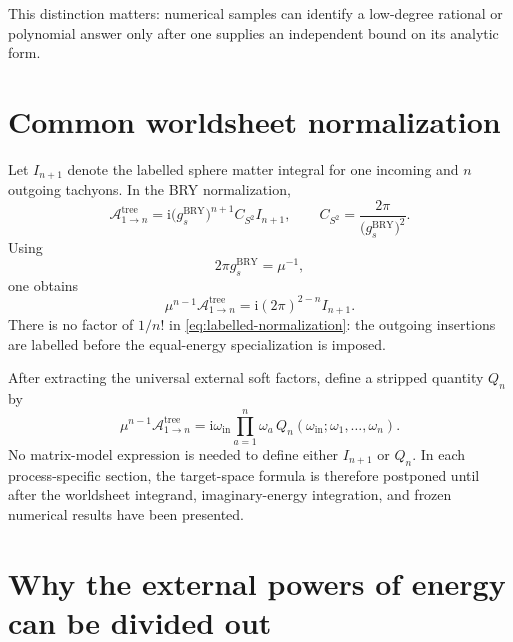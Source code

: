 \documentclass[11pt]{article}
\newcommand{\ii}{\mathrm{i}}
\newcommand{\A}{\mathcal{A}}
\begin{document}
This distinction matters: numerical samples can identify a low-degree
rational or polynomial answer only after one supplies an independent bound
on its analytic form.

\section{Common worldsheet normalization}

Let $I_{n+1}$ denote the labelled sphere matter integral for one incoming and
$n$ outgoing tachyons.  In the BRY normalization,
\begin{equation}
  \A^{\mathrm{tree}}_{1\to n}
  =\ii\bigl(g_s^{\mathrm{BRY}}\bigr)^{n+1}C_{S^2}I_{n+1},
  \qquad
  C_{S^2}=\frac{2\pi}{\bigl(g_s^{\mathrm{BRY}}\bigr)^2}.
  \label{eq:bry-normalization}
\end{equation}
Using
\begin{equation}
  2\pi g_s^{\mathrm{BRY}}=\mu^{-1},
\end{equation}
one obtains
\begin{equation}
  \boxed{
  \mu^{n-1}\A^{\mathrm{tree}}_{1\to n}
  =\ii(2\pi)^{2-n}I_{n+1}.}
  \label{eq:labelled-normalization}
\end{equation}
There is no factor of $1/n!$ in \eqref{eq:labelled-normalization}: the
outgoing insertions are labelled before the equal-energy specialization is
imposed.

After extracting the universal external soft factors, define a stripped
quantity $Q_n$ by
\begin{equation}
  \boxed{
  \mu^{n-1}\A^{\mathrm{tree}}_{1\to n}
  =\ii\omega_{\mathrm{in}}
   \prod_{a=1}^{n}\omega_a\,
   Q_n(\omega_{\mathrm{in}};\omega_1,\ldots,\omega_n).}
  \label{eq:define-Qn}
\end{equation}
No matrix-model expression is needed to define either $I_{n+1}$ or $Q_n$.
In each process-specific section, the target-space formula is therefore
postponed until after the worldsheet integrand, imaginary-energy integration,
and frozen numerical results have been presented.

\section{Why the external powers of energy can be divided out}
\label{sec:soft-factors}
\end{document}
